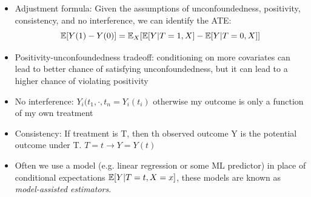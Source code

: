 \documentclass[../main.tex]{subfiles}
\begin{document}
\begin{itemize}
\begin{figure}[h]
\begin{subfigure}{.5\textwidth}
          \caption{Conditioning on $X$ leads to no confounding}
          \label{fig:blocking}
        \end{subfigure}
      \end{figure}
      \item Adjustment formula: Given the assumptions of unconfoundedness, positivity, consistency, and no interference, we can identify the ATE:
      \begin{equation*}
        \mathbb{E}[Y(1) - Y(0)] = \mathbb{E}_{X}[\mathbb{E}[Y|T=1, X]- \mathbb{E}[Y|T=0,X]]
      \end{equation*}
      \item Positivity-unconfoundedness tradeoff: conditioning on more covariates can lead to better chance of satisfying unconfoundedness, but it can lead to a higher chance of violating positivity
      \item No interference: $Y_{i}(t_{1},\cdot, t_{n} = Y_{i}(t_{i})$ otherwise my outcome is only a function of my own treatment
      \item Consistency: If treatment is T, then th observed outcome Y is the potential outcome under T. $T = t \rightarrow Y = Y(t)$
      \item Often we use a model (e.g. linear regression or some ML predictor) in place of conditional expectations $\mathbb{E}[Y|T=t, X=x]$, these models are known as \textit{model-assisted estimators}.
    \end{itemize}
\end{document}
